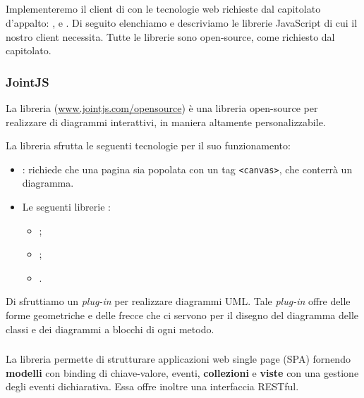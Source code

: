 


\subsection{} \label{sec:tech_client}
Implementeremo il client di \proj{} con le tecnologie web richieste dal capitolato d'appalto: ,  e . Di seguito elenchiamo e descriviamo le librerie JavaScript di cui il nostro client necessita. Tutte le librerie sono open-source, come richiesto dal capitolato.

\subsubsection{JointJS}
La libreria \jointjs{} (\url{www.jointjs.com/opensource}) è una libreria open-source per realizzare  di diagrammi interattivi, in maniera altamente personalizzabile.

La libreria sfrutta le seguenti tecnologie per il suo funzionamento:
\begin{itemize}
	\item \html: \jointjs{} richiede che una pagina \html{} sia popolata con un tag \texttt{<canvas>}, che conterrà un diagramma.
	\item Le seguenti librerie \js:
	\begin{itemize}
		\item \jquery;
		\item \lodash;
		\item \backbonejs.
	\end{itemize}
\end{itemize}

Di \jointjs{} sfruttiamo un \emph{plug-in} per realizzare diagrammi UML. Tale \emph{plug-in} offre delle forme geometriche e delle frecce che ci servono per il disegno del diagramma delle classi e dei diagrammi a blocchi di ogni metodo.

\subsubsection{\backbonejs}
La libreria \backbonejs{} permette di strutturare applicazioni web single page (SPA) fornendo \textbf{modelli} con binding di chiave-valore, eventi, \textbf{collezioni} e \textbf{viste} con una gestione degli eventi dichiarativa. Essa offre inoltre una interfaccia RESTful.

